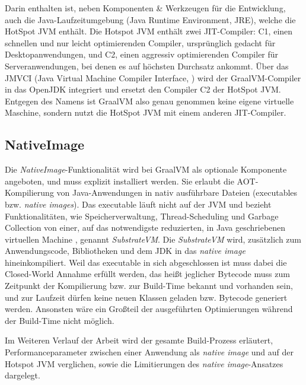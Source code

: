  Darin enthalten ist, neben Komponenten \& Werkzeugen für die Entwicklung, auch die Java-Laufzeitumgebung (Java Runtime Environment, JRE), welche die HotSpot JVM enthält.
Die Hotspot JVM enthält zwei JIT-Compiler: C1, einen schnellen und nur leicht optimierenden Compiler, ursprünglich gedacht für Desktopanwendungen, und C2, einen aggressiv optimierenden Compiler für 
Serveranwendungen, bei denen es auf höchsten Durchsatz ankommt.
Über das JMVCI (Java Virtual Machine Compiler Interface, \parencite{OpenJDK243}) wird der GraalVM-Compiler in das OpenJDK integriert und ersetzt den Compiler C2 der HotSpot JVM. Entgegen des Namens ist GraalVM
also genau genommen keine eigene virtuelle Maschine, sondern nutzt die HotSpot JVM mit einem anderen JIT-Compiler.
\newpage
\subsection{NativeImage}
\label{subsec:nativeImage}

Die \textit{NativeImage}-Funktionalität wird bei GraalVM als optionale Komponente angeboten, und muss explizit installiert werden. 
Sie erlaubt die AOT-Kompilierung von Java-Anwendungen in nativ ausführbare Dateien (executables bzw. \textit{native images}).
Das executable läuft nicht auf der JVM und bezieht Funktionalitäten, wie Speicherverwaltung, Thread-Scheduling und Garbage Collection von einer, auf das notwendigste reduzierten, in Java geschriebenen virtuellen Machine
, genannt \textit{SubstrateVM}\parencite{GraalVMNativeImage}. Die \textit{SubstrateVM} wird, zusätzlich zum Anwendungscode, Bibliotheken und dem JDK in das \textit{native image} hineinkompiliert.
Weil das executable in sich abgeschlossen ist muss dabei die Closed-World Annahme erfüllt werden, das heißt jeglicher Bytecode muss zum Zeitpunkt der Kompilierung bzw. zur Build-Time bekannt und vorhanden sein, und 
zur Laufzeit dürfen keine neuen Klassen geladen bzw. Bytecode generiert werden. Ansonsten wäre ein Großteil der ausgeführten Optimierungen während der Build-Time nicht möglich.

Im Weiteren Verlauf der Arbeit wird der gesamte Build-Prozess erläutert, Performanceparameter zwischen einer Anwendung als \textit{native image} und auf der Hotspot JVM verglichen, sowie die Limitierungen des 
\textit{native image}-Ansatzes dargelegt.
